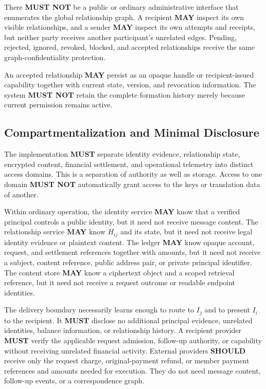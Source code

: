 \documentclass[11pt]{article}
\newcommand{\MUST}{\textbf{MUST}}
\newcommand{\MUSTNOT}{\textbf{MUST NOT}}
\newcommand{\SHOULD}{\textbf{SHOULD}}
\newcommand{\MAY}{\textbf{MAY}}
\begin{document}
There \MUSTNOT{} be a public or ordinary administrative interface that enumerates
the global relationship graph. A recipient \MAY{} inspect its own visible
relationships, and a sender \MAY{} inspect its own attempts and receipts, but neither
party receives another participant's unrelated edges. Pending, rejected, ignored,
revoked, blocked, and accepted relationships receive the same graph-confidentiality
protection.

An accepted relationship \MAY{} persist as an opaque handle or recipient-issued
capability together with current state, version, and revocation information. The
system \MUSTNOT{} retain the complete formation history merely because current
permission remains active.

\subsection{Compartmentalization and Minimal Disclosure}

The implementation \MUST{} separate identity evidence, relationship state,
encrypted content, financial settlement, and operational telemetry into distinct
access domains. This is a separation of authority as well as storage. Access to
one domain \MUSTNOT{} automatically grant access to the keys or translation data
of another.

Within ordinary operation, the identity service \MAY{} know that a verified
principal controls a public identity, but it need not receive message content.
The relationship service \MAY{} know $H_{ij}$ and its state, but it need not receive
legal identity evidence or plaintext content. The ledger \MAY{} know opaque account,
request, and settlement references together with amounts, but it need not receive a
subject, content reference, public address pair, or private principal identifier.
The content store \MAY{} know a ciphertext object and a scoped retrieval reference,
but it need not receive a request outcome or readable endpoint identities.

The delivery boundary necessarily learns enough to route to $I_j$ and to present
$I_i$ to the recipient. It \MUST{} disclose no additional principal evidence,
unrelated identities, balance information, or relationship history. A recipient
provider \MUST{} verify the applicable request admission, follow-up authority,
or capability without receiving unrelated financial activity. External providers
\SHOULD{} receive only the request charge, original-payment refund, or member
payment references and amounts needed for execution. They do not need message
content, follow-up events, or a correspondence graph.
\end{document}
